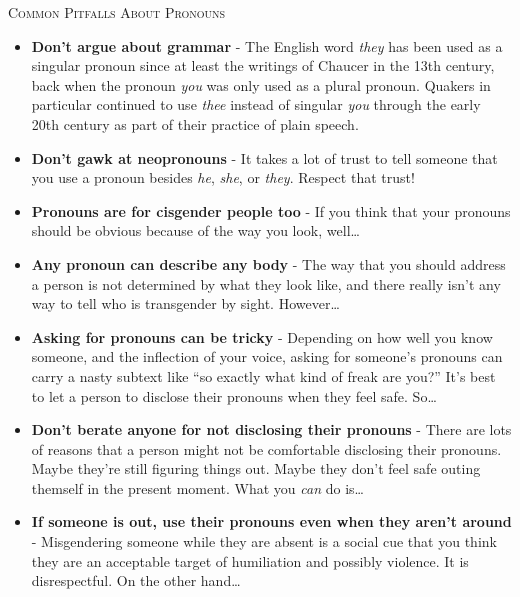 \documentclass[12pt]{article}
\begin{document}
\begin{center}
{\Large \textsc{Common Pitfalls About Pronouns}}
\end{center}

\begin{itemize}

\item \textbf{Don't argue about grammar} - The English word \emph{they} has been used as a singular pronoun since at least the writings of Chaucer in the 13th century, back when the pronoun \emph{you} was only used as a plural pronoun. Quakers in particular continued to use \emph{thee} instead of singular \emph{you} through the early 20th century as part of their practice of plain speech.

\item \textbf{Don't gawk at neopronouns} - It takes a lot of trust to tell someone that you use a pronoun besides \emph{he}, \emph{she}, or \emph{they}. Respect that trust!

\item \textbf{Pronouns are for cisgender people too} - If you think that your pronouns should be obvious because of the way you look, well\ldots

\item \textbf{Any pronoun can describe any body} - The way that you should address a person is not determined by what they look like, and there really isn't any way to tell who is transgender by sight. However\ldots

\item \textbf{Asking for pronouns can be tricky} - Depending on how well you know someone, and the inflection of your voice, asking for someone's pronouns can carry a nasty subtext like ``so exactly what kind of freak are you?'' It's best to let a person to disclose their pronouns when they feel safe. So\ldots

\item \textbf{Don't berate anyone for not disclosing their pronouns} - There are lots of reasons that a person might not be comfortable disclosing their pronouns. Maybe they're still figuring things out. Maybe they don't feel safe outing themself in the present moment. What you \emph{can} do is\ldots

\item \textbf{If someone is out, use their pronouns even when they aren't around} - Misgendering someone while they are absent is a social cue that you think they are an acceptable target of humiliation and possibly violence. It is disrespectful. On the other hand\ldots


\end{itemize}
\end{document}
